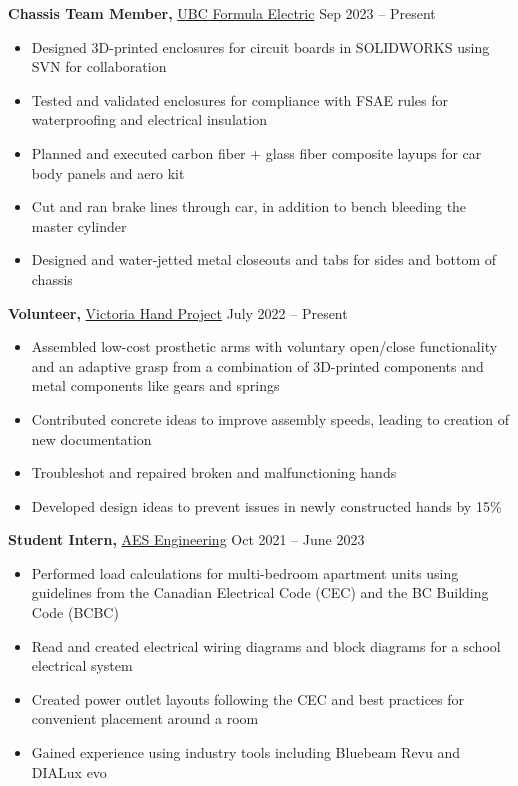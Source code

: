 \documentclass[11pt]{article}       %
\begin{document}
\textbf{Chassis Team Member,} \href{https://www.ubcformulaelectric.com/}{UBC Formula Electric} \hfill Sep 2023 -- Present \\
\vspace{-9pt}
\begin{itemize}
  \item Designed 3D-printed enclosures for circuit boards in SOLIDWORKS using SVN for collaboration
  \item Tested and validated enclosures for compliance with FSAE rules for waterproofing and electrical insulation 
  \item Planned and executed carbon fiber + glass fiber composite layups for car body panels and aero kit
  \item Cut and ran brake lines through car, in addition to bench bleeding the master cylinder
  \item Designed and water-jetted metal closeouts and tabs for sides and bottom of chassis
\end{itemize}

\textbf{Volunteer,} \href{https://www.victoriahandproject.com/}{Victoria Hand Project} \hfill July 2022 -- Present \\
\vspace{-9pt}
\begin{itemize}
  \item Assembled low-cost prosthetic arms with voluntary open/close functionality and an adaptive grasp from a combination of 3D-printed components and metal components like gears and springs
  \item Contributed concrete ideas to improve assembly speeds, leading to creation of new documentation
  \item Troubleshot and repaired broken and malfunctioning hands
  \item Developed design ideas to prevent issues in newly constructed hands by 15\%
\end{itemize}

\textbf{Student Intern,} \href{https://www.aesengr.com/}{AES Engineering} \hfill Oct 2021 -- June 2023 \\
\vspace{-9pt}
\begin{itemize}
  \item Performed load calculations for multi-bedroom apartment units using guidelines from the Canadian Electrical Code (CEC) and the BC Building Code (BCBC)
  \item Read and created electrical wiring diagrams and block diagrams for a school electrical system
  \item Created power outlet layouts following the CEC and best practices for convenient placement around a room
  \item Gained experience using industry tools including Bluebeam Revu and DIALux evo
\end{itemize}
\end{document}
